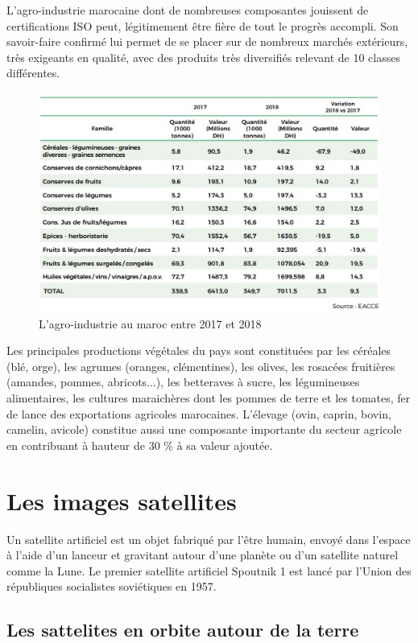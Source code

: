 \documentclass[12pt, openany]{report}
\begin{document}
L’agro-industrie marocaine dont de nombreuses composantes jouissent de certifications ISO peut, légitimement être fière de tout le progrès accompli. Son savoir-faire confirmé lui permet de se placer sur de nombreux marchés extérieurs, très exigeants en qualité, avec des produits très diversifiés relevant de 10 classes différentes.\cite{agr}


\begin{figure}[hp]
\centering
\includegraphics[scale=0.9]{agr.jpg}
\caption{L'agro-industrie au maroc entre 2017 et 2018}
\end{figure}


Les principales productions végétales du pays sont constituées par les céréales (blé, orge), les agrumes (oranges, clémentines), les olives, les rosacées fruitières (amandes, pommes, abricots...), les betteraves à sucre, les légumineuses alimentaires, les cultures maraichères dont les pommes de terre et les tomates, fer de lance des exportations agricoles marocaines. L'élevage (ovin, caprin, bovin, camelin, avicole) constitue aussi une composante importante du secteur agricole en contribuant à hauteur de 30 \% à sa valeur ajoutée.

\section{Les images satellites}
Un satellite artificiel est un objet fabriqué par l'être humain, envoyé dans l'espace à l'aide d'un lanceur et gravitant autour d'une planète ou d'un satellite naturel comme la Lune.  
Le premier satellite artificiel Spoutnik 1 est lancé par l’Union des républiques socialistes soviétiques en 1957.
\subsection{Les sattelites en orbite autour de la terre}
\end{document}
